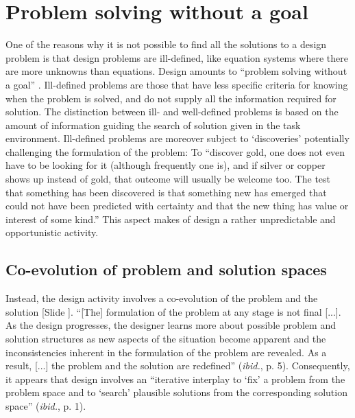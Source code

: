 \documentclass{article}
\newcounter{slide}
\begin{document}
\section{Problem solving without a goal}
\label{sec:GeneralProblemSolving}
One of the reasons why it is not possible to find all the solutions to a design problem is that design problems are ill-defined, like equation systems where there are more unknowns than equations. Design amounts to ``problem solving without a goal'' \cite[p. 106]{simon1996sciences}. Ill-defined problems are those that have less specific criteria for knowing when the problem is solved, and do not supply all the information required for solution. The distinction between ill- and well-defined problems is based on the amount of information guiding the search of solution given in the task environment. Ill-defined problems are moreover subject to `discoveries' potentially challenging the formulation of the problem: To ``discover gold, one does not even have to be looking for it (although frequently one is), and if silver or copper shows up instead of gold, that outcome will usually be welcome too. The test that something has been discovered is that something new has emerged that could not have been predicted with certainty and that the new thing has value or interest of some kind.'' This aspect makes of design a rather unpredictable and opportunistic activity.

\subsection{Co-evolution of problem and solution spaces}
\label{sec:coevolution}

Instead, the design activity involves a co-evolution of the problem and the solution \cite{maherFormalisingDesignExploration1996} {\color{blue}[Slide ]}. ``[The] formulation of the problem at any stage is not final [...]. As the design progresses, the designer learns more about possible problem and solution structures as new aspects of the situation become apparent and the inconsistencies inherent in the formulation of the problem are revealed. As a result, [...] the problem and the solution are redefined'' (\emph{ibid.}, p. 5). Consequently, it appears that design involves an ``iterative interplay to `fix' a problem from the problem space and to `search' plausible solutions from the corresponding solution space'' (\emph{ibid.}, p. 1).
\end{document}
